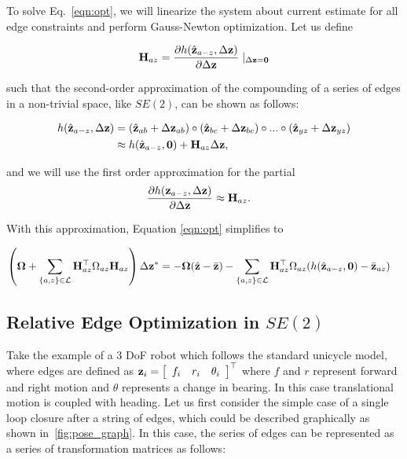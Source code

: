 To solve Eq.~\ref{eqn:opt}, we will linearize the system about current estimate for all edge constraints and perform Gauss-Newton optimization.  Let us define

\begin{align*}
  \mathbf{H}_{az} = \frac{\partial h(\hat{\mathbf{z}}_{a-z},\Delta\mathbf{z})}{\partial \Delta\mathbf{z}} \mid_{\Delta\mathbf{z} = \mathbf{0}}
\end{align*}

such that the second-order approximation of the compounding of a series of edges in a non-trivial space, like $SE(2)$, can be shown as follows:

\begin{align*}
  h(\hat{\mathbf{z}}_{a-z},\Delta\mathbf{z}) &= (\hat{\mathbf{z}}_{ab} + \Delta\mathbf{z}_{ab}) \circ (\hat{\mathbf{z}}_{bc} + \Delta\mathbf{z}_{bc}) \circ ... \circ (\hat{\mathbf{z}}_{yz} + \Delta\mathbf{z}_{yz})\\
   &\approx
  h(\hat{\mathbf{z}}_{a-z},\mathbf{0}) + \mathbf{H}_{az} \Delta\mathbf{z},
\end{align*}

and we will use the first order approximation for the partial
\begin{align*}
  \frac{\partial h(\mathbf{z}_{a-z},\Delta\mathbf{z})}{\partial \Delta\mathbf{z}} &\approx \mathbf{H}_{az}.
\end{align*}

With this approximation, Equation \ref{eqn:opt} simplifies to

\begin{align}
  \left(\boldsymbol{\Omega} + \sum_{\{a,z\} \in \mathcal{L}}
  \mathbf{H}_{az}^\top
  \Omega_{az}\mathbf{H}_{az} \right) \Delta\mathbf{z}^*
  &= -\boldsymbol{\Omega}(\hat{\mathbf{z}} -\bar{\mathbf{z}}) - \sum_{\{a,z\} \in \mathcal{L}}
  \mathbf{H}_{az}^\top
  \Omega_{az}(h(\hat{\mathbf{z}}_{a-z},\mathbf{0}) -\bar{\mathbf{z}}_{az})
  \label{eqn:3d_opt}
\end{align}

\subsection{Relative Edge Optimization in $SE(2)$}

Take the example of a 3 DoF robot which follows the standard unicycle model, where edges are defined as $\mathbf{z}_i = \left[\begin{array}{ccc} f_i & r_i & \theta_i \end{array}\right]^\top$ where $f$ and $r$ represent forward and right motion and $\theta$ represents a change in bearing. In this case translational motion is coupled with heading. Let us first consider the simple case of a single loop closure after a string of edges, which could be described graphically as shown in~\ref{fig:pose_graph}.  In this case, the series of edges can be represented as a series of transformation matrices as follows:


